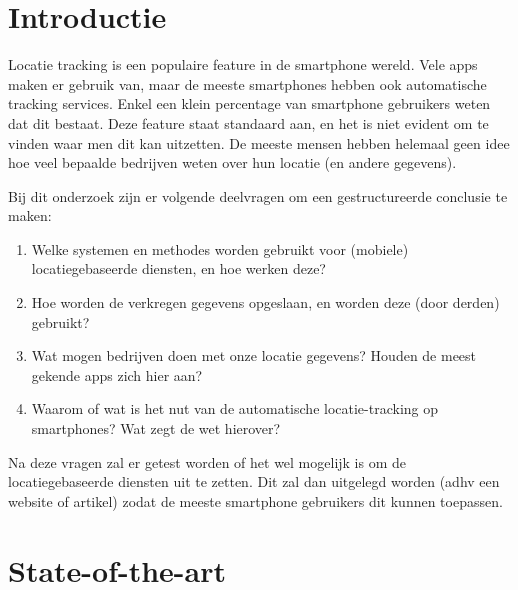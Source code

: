 
\section{Introductie} %
\label{sec:introductie}

Locatie tracking is een populaire feature in de smartphone wereld. Vele apps maken er gebruik van, maar de meeste smartphones hebben ook automatische tracking services. Enkel een klein percentage van smartphone gebruikers weten dat dit bestaat. Deze feature staat standaard aan, en het is niet evident om te vinden waar men dit kan uitzetten. De meeste mensen hebben helemaal geen idee hoe veel bepaalde bedrijven weten over hun locatie (en andere gegevens).

Bij dit onderzoek zijn er volgende deelvragen om een gestructureerde conclusie te maken:

\begin{enumerate}
  \item Welke systemen en methodes worden gebruikt voor (mobiele) locatiegebaseerde diensten, en hoe werken deze?
  \item Hoe worden de verkregen gegevens opgeslaan, en worden deze (door derden) gebruikt?
  \item Wat mogen bedrijven doen met onze locatie gegevens? Houden de meest gekende apps zich hier aan?
  \item Waarom of wat is het nut van de automatische locatie-tracking op smartphones? Wat zegt de wet hierover?
\end{enumerate}

Na deze vragen zal er getest worden of het wel mogelijk is om de locatiegebaseerde diensten uit te zetten. Dit zal dan uitgelegd worden (adhv een website of artikel) zodat de meeste smartphone gebruikers dit kunnen toepassen. 


\section{State-of-the-art}
\label{sec:state-of-the-art}

